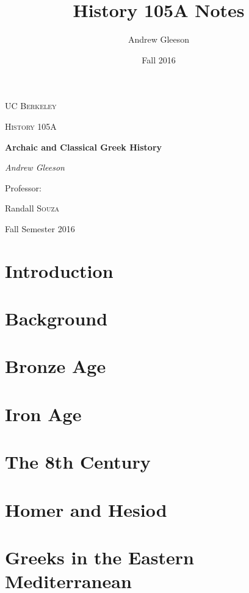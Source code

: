 \documentclass[a4paper]{article}
\title{History 105A Notes}
\author{Andrew Gleeson}
\date{Fall 2016}
\begin{document}
\begin{titlepage}
	\centering

	{\scshape\LARGE UC Berkeley \par}
	\vspace{1cm}
	{\scshape\Large History 105A\par}
	\vspace{1.5cm}
	{\huge\bfseries Archaic and Classical Greek History\par}
	\vspace{2cm}
	{\Large\itshape Andrew Gleeson\par}
	\vfill
	Professor:\par
	Randall \textsc{Souza}

	\vfill

	{\large Fall Semester 2016\par}
\end{titlepage}

\tableofcontents
\newpage

\section{Introduction}

\section{Background}


\section{Bronze Age}

\section{Iron Age}

\section{The 8th Century}

\section{Homer and Hesiod}

\section{Greeks in the Eastern Mediterranean}
\end{document}
